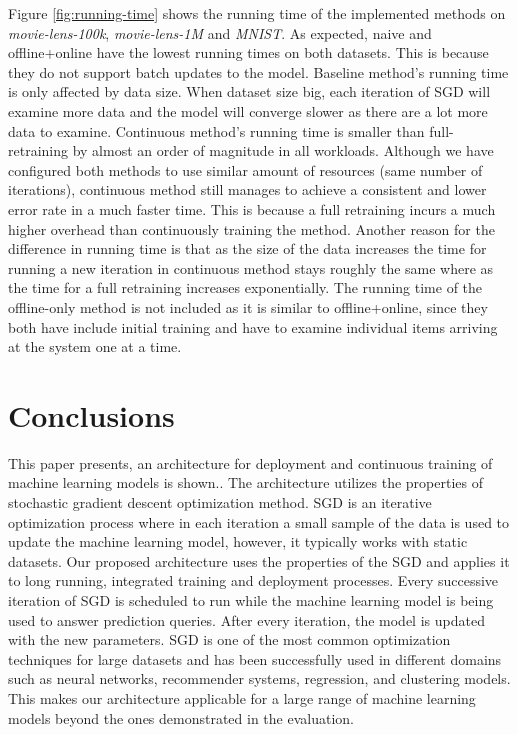 \documentclass{sig-alternate-05-2015}
\begin{document}
Figure \ref{fig:running-time} shows the running time of the implemented methods on \textit{movie-lens-100k}, \textit{movie-lens-1M} and \textit{MNIST}.
As expected, naive and offline+online have the lowest running times on both datasets.
This is because they do not support batch updates to the model.
Baseline method's running time is only affected by data size.
When dataset size big, each iteration of SGD will examine more data and the model will converge slower as there are a lot more data to examine.
Continuous method's running time is smaller than full-retraining by almost an order of magnitude in all workloads.
Although we have configured both methods to use similar amount of resources (same number of iterations), continuous method still manages to achieve a consistent and lower error rate in a much faster time.
This is because a full retraining incurs a much higher overhead than continuously training the method.
Another reason for the difference in running time is that as the size of the data increases the time for running a new iteration in continuous method stays roughly the same where as the time for a full retraining increases exponentially.
The running time of the offline-only method is not included as it is similar to offline+online, since they both have include initial training and have to examine individual items arriving at the system one at a time.

\section{Conclusions} \label{conclusion}
This paper presents, an architecture for deployment and continuous training of machine learning models is shown.. 
The architecture utilizes the properties of stochastic gradient descent optimization method.
SGD is an iterative optimization process where in each iteration a small sample of the data is used to update the machine learning model, however, it typically works with static datasets.
Our proposed architecture uses the properties of the SGD and applies it to long running, integrated training and deployment processes.
Every successive iteration of SGD is scheduled to run while the machine learning model is being used to answer prediction queries.
After every iteration, the model is updated with the new parameters.
SGD is one of the most common optimization techniques for large datasets and has been successfully used in different domains such as neural networks, recommender systems, regression, and clustering models. This makes our architecture applicable for a large range of machine learning models beyond the ones demonstrated in the evaluation.
\end{document}

